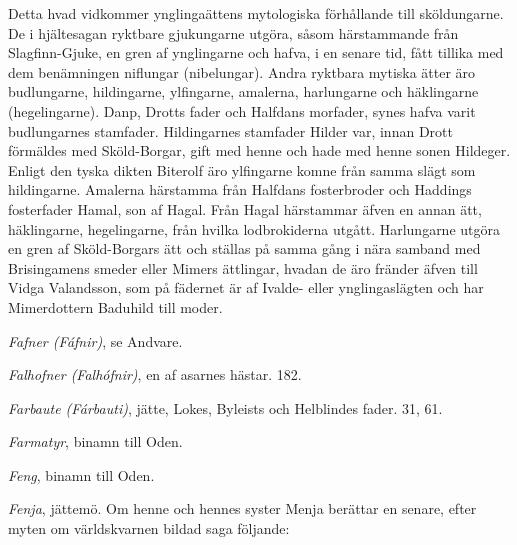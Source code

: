 Detta hvad vidkommer ynglingaättens mytologiska förhållande till
sköldungarne. De i hjältesagan ryktbare gjukungarne utgöra, såsom
härstammande från Slagfinn-Gjuke, en gren af ynglingarne och hafva, i en
senare tid, fått tillika med dem benämningen niflungar (nibelungar).
Andra ryktbara mytiska ätter äro budlungarne, hildingarne, ylfingarne,
amalerna, harlungarne och häklingarne (hegelingarne). Danp, Drotts fader
och Halfdans morfader, synes hafva varit budlungarnes stamfader.
Hildingarnes stamfader Hilder var, innan Drott förmäldes med
Sköld-Borgar, gift med henne och hade med henne sonen Hildeger. Enligt
den tyska dikten Biterolf äro ylfingarne komne från samma slägt som
hildingarne. Amalerna härstamma från Halfdans fosterbroder och Haddings
fosterfader Hamal, son af Hagal. Från Hagal härstammar äfven en annan
ätt, häklingarne, hegelingarne, från hvilka lodbrokiderna utgått.
Harlungarne utgöra en gren af Sköld-Borgars ätt och ställas på samma
gång i nära samband med Brisingamens smeder eller Mimers ättlingar,
hvadan de äro fränder äfven till Vidga Valandsson, som på fädernet är af
Ivalde- eller ynglingaslägten och har Mimerdottern Baduhild till moder.

\emph{Fafner (Fáfnir)}, se Andvare.

\emph{Falhofner (Falhófnir)}, en af asarnes hästar. 182.

\emph{Farbaute (Fárbauti)}, jätte, Lokes, Byleists och Helblindes fader.
31, 61.

\emph{Farmatyr}, binamn till Oden.

\emph{Feng}, binamn till Oden.

\emph{Fenja}, jättemö. Om henne och hennes syster Menja berättar en
senare, efter myten om världskvarnen bildad saga följande:

